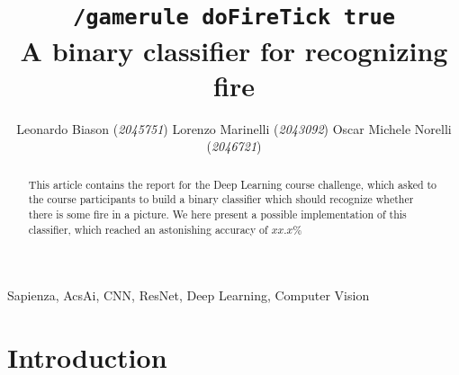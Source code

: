 \documentclass[11pt, journal]{IEEEtran}
\title{\texttt{/gamerule doFireTick true}\\A binary classifier for recognizing fire}
\author{Leonardo Biason (\textit{2045751}) \quad Lorenzo Marinelli (\textit{2043092}) \quad Oscar Michele Norelli (\textit{2046721})}
\begin{document}
\maketitle

\begin{abstract}
    This article contains the report for the Deep Learning course challenge, which asked to the course participants to build a binary classifier which should recognize whether there is some fire in a picture. We here present a possible implementation of this classifier, which reached an astonishing accuracy of $xx.x\%$
\end{abstract}

\begin{keywords}
    Sapienza, AcsAi, CNN, ResNet, Deep Learning, Computer Vision 
\end{keywords}

\section{Introduction}

\lipsum
\lipsum
\lipsum
\lipsum
\lipsum
\lipsum
\lipsum
\lipsum
\lipsum
\lipsum
\end{document}

